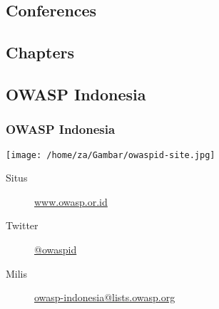 \documentclass[xcolor=pdftex,table,handouts]{beamer}
\begin{document}
\subsection{Conferences} 


\subsection{Chapters}


\subsection{OWASP Indonesia}

\begin{frame}
	\frametitle{OWASP Indonesia}
	\begin{center}
		\texttt{[image: /home/za/Gambar/owaspid-site.jpg]}			
	\end{center}
	\begin{description}
		\item[Situs] {\href{http://www.owasp.or.id}{www.owasp.or.id}}
		\item[Twitter] {\href{http://twitter.com/owaspid}{@owaspid}} \\ 
		\item[Milis] {\href{https://lists.owasp.org/mailman/listinfo/owasp-indonesia}{owasp-indonesia@lists.owasp.org}}
	\end{description}
\end{frame}
\end{document}
